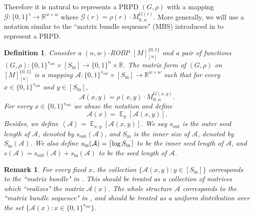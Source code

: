 \documentclass[10pt,a4paper]{article}
\newtheorem{definition}[theorem]{Definition}
\newtheorem{remark}[theorem]{Remark}
\DeclareMathOperator*{\Ex}{\mathbb E}
\newcommand{\ex}[2][]{\Ex_{#1}\left[#2\right]}
\newcommand{\inp}[1]{\left\langle#1\right\rangle}
\DeclarePairedDelimiter\ceil{\lceil}{\rceil}
\newcommand{\bbR}{\mathbb R}
\newcommand{\cA}{\mathcal A}
\newcommand{\cG}{\mathcal G}
\newcommand{\bits}[1]{\{0,1\}^{#1}}
\newcommand{\bit}{\{0,1\}}
\newcommand{\sout}[1][]{s_{\mathrm{out}#1}}
\newcommand{\si}[1][]{s_{\mathrm{in}#1}}
\newcommand{\Si}{S_{\mathrm{in}}}
\begin{document}
Therefore it is natural to represents a PRPD $(G,\rho)$ with a mapping $\cG:\bits{s}\to \bbR^{w\times w}$ where $\cG(r)=\rho(r)\cdot M^{G(r)}_{0..n}$. More generally, we will use a notation similar to the ``matrix bundle sequence" (MBS) introduced in \cite{BCG18} to represent a PRPD.

\begin{definition}\label{def:MBS}
Consider a $(n,w)$-ROBP $[M]_{[n]}^{\bit}$ and a pair of functions $(G,\rho):\bits{\sout}\times[\Si]\to\bits{n}\times\bbR$. The \emph{matrix form} of $(G,\rho)$ on $[M]_{[n]}^{\bit}$ is a mapping $\cA:\bits{\sout}\times[\Si]\to\bbR^{w\times w}$ such that for every $x\in\bits{\sout}$ and $y\in[\Si]$,
$$\cA(x,y)=\rho(x,y)\cdot M_{0..n}^{G(x,y)}.$$
For every $x\in\bits{\sout}$ we abuse the notation and define
$$\cA(x)=\ex[y]{\cA(x,y)}.$$
Besides, we define $\inp{\cA}=\ex[x,y]{\cA(x,y)}$. We say $\sout$ is the \emph{outer seed length} of $\cA$, denoted by $\sout(\cA)$, and $\Si$ is the \emph{inner size} of $\cA$, denoted by $\Si(\cA)$. We also define $\si(\cA)=\ceil{\log \Si}$ to be the \emph{inner seed length} of $\cA$, and $s(\cA)=\sout(\cA)+\si(\cA)$ to be the \emph{seed length} of $\cA$.
\end{definition}
\begin{remark}
For every fixed $x$, the collection $\{\cA(x,y):y\in[\Si]\}$ corresponds to the ``matrix bundle" in \cite{BCG18}. This should be treated as a collection of matrices which ``realizes" the matrix $\cA(x)$. The whole structure $\cA$ corresponds to the ``matrix bundle sequence" in \cite{BCG18}, and should be treated as a uniform distribution over the set $\{\cA(x):x\in\bits{\sout}\}$. 
\end{remark}
\end{document}
